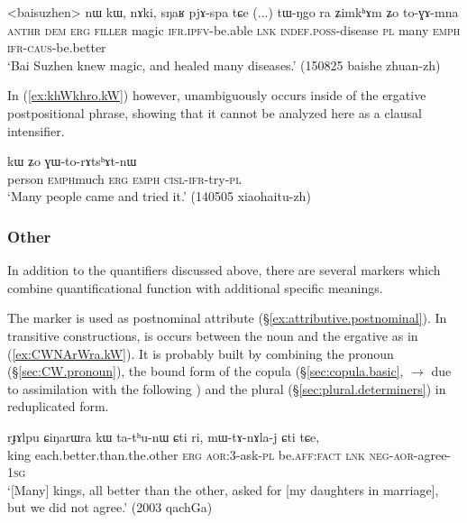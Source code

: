 \begin{exe}
\ex \label{ex:tWNgo.ZimkhAm}
\gll <baisuzhen> nɯ kɯ, nɤki, sŋaʁ pjɤ-spa tɕe (...) tɯ-ŋgo ra ʑimkʰɤm ʑo to-ɣɤ-mna \\
\textsc{anthr} \textsc{dem} \textsc{erg} \textsc{filler} magic \textsc{ifr}.\textsc{ipfv}-be.able \textsc{lnk} {  } \textsc{indef}.\textsc{poss}-disease \textsc{pl} many \textsc{emph} \textsc{ifr}-\textsc{caus}-be.better \\
\glt `Bai Suzhen knew magic, and healed many diseases.' (150825 baishe zhuan-zh)
\end{exe}

In (\ref{ex:khWkhro.kW}) however,  unambiguously occurs inside of the ergative postpositional phrase, showing that it cannot be analyzed here as a clausal intensifier.

\begin{exe}
\ex \label{ex:khWkhro.kW}
 kɯ ʑo ɣɯ-to-rɤtsʰɤt-nɯ \\
person \textsc{emph}\redp{}much \textsc{erg} \textsc{emph} \textsc{cisl}-\textsc{ifr}-try-\textsc{pl} \\
\glt `Many people came and tried it.' (140505 xiaohaitu-zh)
\end{exe}

\subsubsection{Other} \label{sec:quantifiers.other}
In addition to the quantifiers discussed above, there are several markers which combine  quantificational function with additional specific meanings.

The marker  is used as postnominal attribute (§\ref{ex:attributive.postnominal}). In transitive constructions, is occurs between the noun and the ergative  as in  (\ref{ex:CWNArWra.kW}). It is probably built by combining the pronoun   (§\ref{sec:CW.pronoun}), the bound form of the copula   (§\ref{sec:copula.basic},  $\rightarrow$  due to assimilation with the following ) and the plural  (§\ref{sec:plural.determiners}) in reduplicated form.
 
  
\begin{exe}
\ex \label{ex:CWNArWra.kW}
\gll   rɟɤlpu ɕiŋarɯra kɯ ta-tʰu-nɯ ɕti ri, mɯ-tɤ-nɤla-j ɕti tɕe, \\
king each.better.than.the.other \textsc{erg} \textsc{aor}:3\flobv{}-ask-\textsc{pl} be.\textsc{aff}:\textsc{fact} \textsc{lnk} \textsc{neg}-\textsc{aor}-agree-\textsc{1sg} \\
\glt `[Many] kings, all better than the other, asked for [my daughters in marriage], but we did not agree.' (2003 qachGa)
\end{exe}

